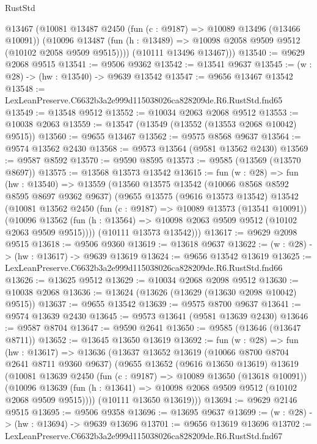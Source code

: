 \begin{lexlean}{RustStd}
\begin{coremodule}
        @13467
        (@10081
          @13487
          @2450
          (fun (c : @9187) => @10089 @13496 (@13466 @10091))
          (@10096 @13487 (fun (h : @13489) => @10098 @2058 @9509 @9512 (@10102 @2058 @9509 @9515))))
        (@10111 @13496 @13467)))
@13540 := @9629 @2068 @9515
@13541 := @9506 @9362
@13542 := @13541 @9637
@13545 := (w : @28) -> (hw : @13540) -> @9639 @13542
@13547 := @9656 @13467 @13542
@13548 := LexLeanPreserve.C6632b3a2e999d115038026ca828209de.R6.RustStd.fnd65
@13549 := @13548 @9512
@13552 := @10034 @2063 @2068 @9512
@13553 := @10038 @2063
@13559 := @13547 (@13549 (@13552 (@13553 @2068 @10042) @9515))
@13560 := @9655 @13467
@13562 := @9575 @8568 @9637
@13564 := @9574 @13562 @2430
@13568 := @9573 @13564 (@9581 @13562 @2430)
@13569 := @9587 @8592
@13570 := @9590 @8595
@13573 := @9585 (@13569 (@13570 @8697))
@13575 := @13568 @13573 @13542
@13615 := fun (w : @28) =>
  fun (hw : @13540) =>
  @13559
    (@13560
      @13575
      @13542
      (@10066 @8568 @8592 @8595 @8697 @9362 @9637)
      (@9655
        @13575
        (@9616 @13573 @13542)
        @13542
        (@10081
          @13562
          @2450
          (fun (c : @9187) => @10089 @13573 (@13541 @10091))
          (@10096 @13562 (fun (h : @13564) => @10098 @2063 @9509 @9512 (@10102 @2063 @9509 @9515))))
        (@10111 @13573 @13542)))
@13617 := @9629 @2098 @9515
@13618 := @9506 @9360
@13619 := @13618 @9637
@13622 := (w : @28) -> (hw : @13617) -> @9639 @13619
@13624 := @9656 @13542 @13619
@13625 := LexLeanPreserve.C6632b3a2e999d115038026ca828209de.R6.RustStd.fnd66
@13626 := @13625 @9512
@13629 := @10034 @2068 @2098 @9512
@13630 := @10038 @2068
@13636 := @13624 (@13626 (@13629 (@13630 @2098 @10042) @9515))
@13637 := @9655 @13542
@13639 := @9575 @8700 @9637
@13641 := @9574 @13639 @2430
@13645 := @9573 @13641 (@9581 @13639 @2430)
@13646 := @9587 @8704
@13647 := @9590 @2641
@13650 := @9585 (@13646 (@13647 @8711))
@13652 := @13645 @13650 @13619
@13692 := fun (w : @28) =>
  fun (hw : @13617) =>
  @13636
    (@13637
      @13652
      @13619
      (@10066 @8700 @8704 @2641 @8711 @9360 @9637)
      (@9655
        @13652
        (@9616 @13650 @13619)
        @13619
        (@10081
          @13639
          @2450
          (fun (c : @9187) => @10089 @13650 (@13618 @10091))
          (@10096 @13639 (fun (h : @13641) => @10098 @2068 @9509 @9512 (@10102 @2068 @9509 @9515))))
        (@10111 @13650 @13619)))
@13694 := @9629 @2146 @9515
@13695 := @9506 @9358
@13696 := @13695 @9637
@13699 := (w : @28) -> (hw : @13694) -> @9639 @13696
@13701 := @9656 @13619 @13696
@13702 := LexLeanPreserve.C6632b3a2e999d115038026ca828209de.R6.RustStd.fnd67

\end{coremodule}
\end{lexlean}
